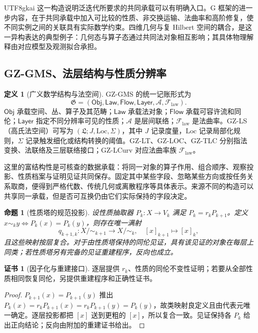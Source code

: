 \documentclass[11pt,a4paper]{article}
\theoremstyle{plain}
\newtheorem{proposition}[theorem]{命题}
\theoremstyle{definition}
\newtheorem{definition}[theorem]{定义}
\newtheorem*{certificate}{证书}
\theoremstyle{remark}
\begin{document}
\begin{CJK*}{UTF8}{gkai}
这一构造说明泛迭代所要求的共同承载可以有明确入口。G 框架的进一步内容，在于共同承载中加入可比较的性质、非交换运输、法曲率和高阶修复，使不同实例之间的关联具有实际数学约束。四维几何与复 Hilbert 空间的耦合，是这一异构表达的典型例子：几何态与算子态通过共同法对象相互影响；其具体物理解释由对应模型及观测拟合承担。\cite{S01,S02}

\subsection{GZ-GMS、法层结构与性质分辨率}

\begin{definition}[广义数学结构与法空间]
\label{fa:def-gms}
GZ-GMS 的统一记账形式为
\[
 \mathfrak G=(\mathsf{Obj},\mathsf{Law},\mathsf{Flow},
 \mathsf{Layer},\mathcal A,\mathcal F_{\mathrm{law}}).
\]
$\mathsf{Obj}$ 承载空间、丛、算子及其范畴；$\mathsf{Law}$ 承载法对象；$\mathsf{Flow}$ 承载可容许流和同伦；$\mathsf{Layer}$ 指定不同分辨率可见的性质；$\mathcal A$ 是层间联络；$\mathcal F_{\mathrm{law}}$ 是法曲率。GZ-LS（高氏法空间）可写为 $(\mathfrak L;J,\mathrm{Loc},\Sigma)$，其中 $J$ 记录度量，$\mathrm{Loc}$ 记录局部化规则，$\Sigma$ 记录触发细化或结构转换的阈值。GZ-LT、GZ-LOC、GZ-TLC 分别指法变换、法联络及三层联络接口；GZ-LCurv 对应法曲率族 $\mathcal F_{\mathrm{law}}$。
\end{definition}

这里的富结构性是可核查的数据承载：将同一对象的算子作用、组合顺序、观察投影、性质档案与证明见证共同保存。固定其中某些字段、忽略某些方向或按任务关系取商，便得到严格代数、传统几何或离散程序等具体表示。来源不同的构造可以共享同一承载，但是否可互换仍由它们实际保持的字段决定。\cite{S01,S09,S10}

\begin{proposition}[性质塔的规范投影]
\label{fa:prop-propertytower}
设性质抽取器 $P_k:X\to V_k$ 满足 $P_k=r_kP_{k+1}$。定义 $x\sim_k y\iff P_k(x)=P_k(y)$，则存在唯一满射
\[
 q_{k+1,k}:X/{\sim_{k+1}}\longrightarrow X/{\sim_k},\quad
 [x]_{k+1}\longmapsto[x]_k,
\]
且这些映射按层复合。对于由性质塔保持的同伦见证，具有该见证的对象在每层上同类；若性质塔另有完备的见证重建程序，反向也成立。
\end{proposition}
\begin{certificate}[因子化与重建接口]
逐层提供 $r_k$、性质的同伦不变性证明；若要从全部性质相同恢复同伦，另提供重建程序和正确性证书。
\end{certificate}
\begin{proof}
$P_{k+1}(x)=P_{k+1}(y)$ 推出 $P_k(x)=r_kP_{k+1}(x)=r_kP_{k+1}(y)=P_k(y)$，故类映射良定义且由代表元唯一确定。逐层投影都把 $[x]$ 送到更粗的 $[x]$，所以复合一致。见证保持各 $P_k$ 给出正向结论；反向由附加的重建证书给出。
\end{proof}


\end{CJK*}
\end{document}
